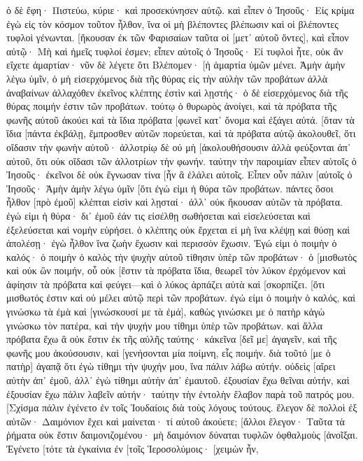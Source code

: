 ὁ δὲ ἔφη· Πιστεύω, κύριε· καὶ προσεκύνησεν αὐτῷ. 
καὶ εἶπεν ὁ Ἰησοῦς· Εἰς κρίμα ἐγὼ εἰς τὸν κόσμον τοῦτον ἦλθον, ἵνα οἱ μὴ βλέποντες βλέπωσιν καὶ οἱ βλέποντες τυφλοὶ γένωνται. 
[ἤκουσαν ἐκ τῶν Φαρισαίων ταῦτα οἱ [μετ᾽ αὐτοῦ ὄντες], καὶ εἶπον αὐτῷ· Μὴ καὶ ἡμεῖς τυφλοί ἐσμεν; 
εἶπεν αὐτοῖς ὁ Ἰησοῦς· Εἰ τυφλοὶ ἦτε, οὐκ ἂν εἴχετε ἁμαρτίαν· νῦν δὲ λέγετε ὅτι Βλέπομεν· [ἡ ἁμαρτία ὑμῶν μένει. 
Ἀμὴν ἀμὴν λέγω ὑμῖν, ὁ μὴ εἰσερχόμενος διὰ τῆς θύρας εἰς τὴν αὐλὴν τῶν προβάτων ἀλλὰ ἀναβαίνων ἀλλαχόθεν ἐκεῖνος κλέπτης ἐστὶν καὶ λῃστής· 
ὁ δὲ εἰσερχόμενος διὰ τῆς θύρας ποιμήν ἐστιν τῶν προβάτων. 
τούτῳ ὁ θυρωρὸς ἀνοίγει, καὶ τὰ πρόβατα τῆς φωνῆς αὐτοῦ ἀκούει καὶ τὰ ἴδια πρόβατα [φωνεῖ κατ᾽ ὄνομα καὶ ἐξάγει αὐτά. 
[ὅταν τὰ ἴδια [πάντα ἐκβάλῃ, ἔμπροσθεν αὐτῶν πορεύεται, καὶ τὰ πρόβατα αὐτῷ ἀκολουθεῖ, ὅτι οἴδασιν τὴν φωνὴν αὐτοῦ· 
ἀλλοτρίῳ δὲ οὐ μὴ [ἀκολουθήσουσιν ἀλλὰ φεύξονται ἀπ᾽ αὐτοῦ, ὅτι οὐκ οἴδασι τῶν ἀλλοτρίων τὴν φωνήν. 
ταύτην τὴν παροιμίαν εἶπεν αὐτοῖς ὁ Ἰησοῦς· ἐκεῖνοι δὲ οὐκ ἔγνωσαν τίνα [ἦν ἃ ἐλάλει αὐτοῖς. 
Εἶπεν οὖν πάλιν [αὐτοῖς ὁ Ἰησοῦς· Ἀμὴν ἀμὴν λέγω ὑμῖν [ὅτι ἐγώ εἰμι ἡ θύρα τῶν προβάτων. 
πάντες ὅσοι ἦλθον [πρὸ ἐμοῦ] κλέπται εἰσὶν καὶ λῃσταί· ἀλλ᾽ οὐκ ἤκουσαν αὐτῶν τὰ πρόβατα. 
ἐγώ εἰμι ἡ θύρα· δι᾽ ἐμοῦ ἐάν τις εἰσέλθῃ σωθήσεται καὶ εἰσελεύσεται καὶ ἐξελεύσεται καὶ νομὴν εὑρήσει. 
ὁ κλέπτης οὐκ ἔρχεται εἰ μὴ ἵνα κλέψῃ καὶ θύσῃ καὶ ἀπολέσῃ· ἐγὼ ἦλθον ἵνα ζωὴν ἔχωσιν καὶ περισσὸν ἔχωσιν. 
Ἐγώ εἰμι ὁ ποιμὴν ὁ καλός· ὁ ποιμὴν ὁ καλὸς τὴν ψυχὴν αὐτοῦ τίθησιν ὑπὲρ τῶν προβάτων· 
ὁ [μισθωτὸς καὶ οὐκ ὢν ποιμήν, οὗ οὐκ [ἔστιν τὰ πρόβατα ἴδια, θεωρεῖ τὸν λύκον ἐρχόμενον καὶ ἀφίησιν τὰ πρόβατα καὶ φεύγει—καὶ ὁ λύκος ἁρπάζει αὐτὰ καὶ [σκορπίζει. 
[ὅτι μισθωτός ἐστιν καὶ οὐ μέλει αὐτῷ περὶ τῶν προβάτων. 
ἐγώ εἰμι ὁ ποιμὴν ὁ καλός, καὶ γινώσκω τὰ ἐμὰ καὶ [γινώσκουσί με τὰ ἐμά], 
καθὼς γινώσκει με ὁ πατὴρ κἀγὼ γινώσκω τὸν πατέρα, καὶ τὴν ψυχήν μου τίθημι ὑπὲρ τῶν προβάτων. 
καὶ ἄλλα πρόβατα ἔχω ἃ οὐκ ἔστιν ἐκ τῆς αὐλῆς ταύτης· κἀκεῖνα [δεῖ με] ἀγαγεῖν, καὶ τῆς φωνῆς μου ἀκούσουσιν, καὶ [γενήσονται μία ποίμνη, εἷς ποιμήν. 
διὰ τοῦτό [με ὁ πατὴρ] ἀγαπᾷ ὅτι ἐγὼ τίθημι τὴν ψυχήν μου, ἵνα πάλιν λάβω αὐτήν. 
οὐδεὶς [αἴρει αὐτὴν ἀπ᾽ ἐμοῦ, ἀλλ᾽ ἐγὼ τίθημι αὐτὴν ἀπ᾽ ἐμαυτοῦ. ἐξουσίαν ἔχω θεῖναι αὐτήν, καὶ ἐξουσίαν ἔχω πάλιν λαβεῖν αὐτήν· ταύτην τὴν ἐντολὴν ἔλαβον παρὰ τοῦ πατρός μου. 
[Σχίσμα πάλιν ἐγένετο ἐν τοῖς Ἰουδαίοις διὰ τοὺς λόγους τούτους. 
ἔλεγον δὲ πολλοὶ ἐξ αὐτῶν· Δαιμόνιον ἔχει καὶ μαίνεται· τί αὐτοῦ ἀκούετε; 
[ἄλλοι ἔλεγον· Ταῦτα τὰ ῥήματα οὐκ ἔστιν δαιμονιζομένου· μὴ δαιμόνιον δύναται τυφλῶν ὀφθαλμοὺς [ἀνοῖξαι. 
Ἐγένετο [τότε τὰ ἐγκαίνια ἐν [τοῖς Ἱεροσολύμοις· [χειμὼν ἦν, 
